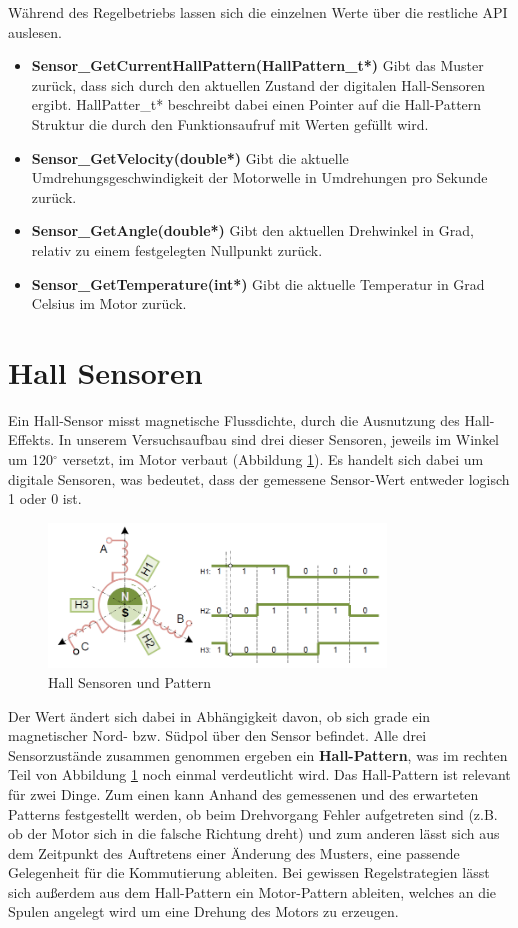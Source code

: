 \noindent
Während des Regelbetriebs lassen sich die einzelnen Werte über die restliche API auslesen.

\begin{itemize}
\item \textbf{Sensor\_GetCurrentHallPattern(HallPattern\_t*)} Gibt das Muster zurück, dass sich durch den aktuellen Zustand der digitalen Hall-Sensoren ergibt. HallPatter\_t* beschreibt dabei einen Pointer auf die Hall-Pattern Struktur die durch den Funktionsaufruf mit Werten gefüllt wird.
\item \textbf{Sensor\_GetVelocity(double*)} Gibt die aktuelle Umdrehungsgeschwindigkeit der Motorwelle in Umdrehungen pro Sekunde zurück.
\item \textbf{Sensor\_GetAngle(double*)} Gibt den aktuellen Drehwinkel in Grad, relativ zu einem festgelegten Nullpunkt zurück.
\item \textbf{Sensor\_GetTemperature(int*)} Gibt die aktuelle Temperatur in Grad Celsius im Motor zurück.
\end{itemize}

\section{Hall Sensoren}
Ein Hall-Sensor misst magnetische Flussdichte, durch die Ausnutzung des Hall-Effekts. In unserem Versuchsaufbau sind drei dieser Sensoren, jeweils im Winkel um 120$^\circ$ versetzt, im Motor verbaut (Abbildung \ref{img:hall_sample}). Es handelt sich dabei um digitale Sensoren, was bedeutet, dass der gemessene Sensor-Wert entweder logisch 1 oder 0 ist.

\begin{figure}[h]
\centering
\includegraphics[width=0.8\textwidth]{sensor/hall_sample.PNG}
\caption{Hall Sensoren und Pattern}
\label{img:hall_sample}
\end{figure}

Der Wert ändert sich dabei in Abhängigkeit davon, ob sich grade ein magnetischer Nord- bzw. Südpol über den Sensor befindet. Alle drei Sensorzustände zusammen genommen ergeben ein \textbf{Hall-Pattern}, was im rechten Teil von Abbildung \ref{img:hall_sample} noch einmal verdeutlicht wird. Das Hall-Pattern ist relevant für zwei Dinge. Zum einen kann Anhand des gemessenen und des erwarteten Patterns festgestellt werden, ob beim Drehvorgang Fehler aufgetreten sind (z.B. ob der Motor sich in die falsche Richtung dreht) und zum anderen lässt sich aus dem Zeitpunkt des Auftretens einer Änderung des Musters, eine passende Gelegenheit für die Kommutierung ableiten. Bei gewissen Regelstrategien lässt sich außerdem aus dem Hall-Pattern ein Motor-Pattern ableiten, welches an die Spulen angelegt wird um eine Drehung des Motors zu erzeugen.

